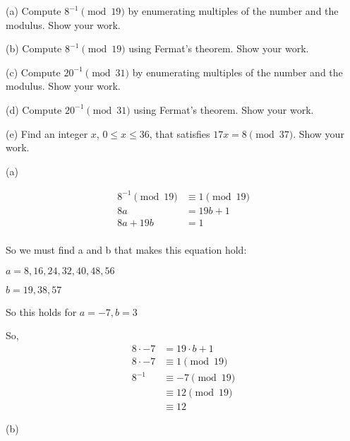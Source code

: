 
\begin{problem}
(a) Compute $8^{-1}\pmod{19}$ by enumerating multiples of the number and the modulus.
Show your work.

\smallskip\noindent
(b) Compute $8^{-1}\pmod{19}$ using Fermat's theorem. Show your work.

\smallskip\noindent
(c) Compute $20^{-1}\pmod{31}$ by enumerating multiples of the number and the modulus.
Show your work.

\smallskip\noindent
(d) Compute $20^{-1}\pmod{31}$ using Fermat's theorem. Show your work.

\smallskip\noindent
(e) Find an integer $x$, $0\le x \le 36$, that satisfies
$17x = 8 \pmod{37}$. Show your work.
\end{problem}

\begin{solution}
(a)

\begin{align*}
8^{-1} \pmod{19} &\equiv 1 \pmod{19}\\
8a &= 19b + 1\\
8a + 19b &= 1\\
\end{align*}
\smallskip\noindent

So we must find a and b that makes this equation hold:

$a = {8, 16, 24, 32, 40, 48, 56}$

$b = {19, 38, 57}$

So this holds for $a=-7, b=3$

So, 
\begin{align*}
8 \cdot -7 &= 19 \cdot b + 1\\
8 \cdot -7 &\equiv 1 \pmod{19}\\
8^{-1} &\equiv -7 \pmod{19}\\
&\equiv 12 \pmod{19}\\
&\equiv 12
\end{align*}

(b)


\end{solution}
